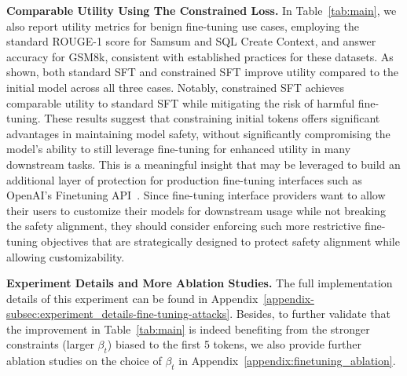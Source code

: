 \textbf{Comparable Utility Using The Constrained Loss.} In Table~\ref{tab:main}, we also report utility metrics for benign fine-tuning use cases, employing the standard ROUGE-1 score for Samsum and SQL Create Context, and answer accuracy for GSM8k, consistent with established practices for these datasets. As shown, both standard SFT and constrained SFT improve utility compared to the initial model across all three cases. Notably, constrained SFT achieves comparable utility to standard SFT while mitigating the risk of harmful fine-tuning. These results suggest that constraining initial tokens offers significant advantages in maintaining model safety, without significantly compromising the model's ability to still leverage fine-tuning for enhanced utility in many downstream tasks. This is a meaningful insight that may be leveraged to build an additional layer of protection for production fine-tuning interfaces such as OpenAI's Finetuning API~\cite{openaiFinetune}. Since fine-tuning interface providers want to allow their users to customize their models for downstream usage while not breaking the safety alignment, they should consider enforcing such more restrictive fine-tuning objectives that are strategically designed to protect safety alignment while allowing customizability. 






\textbf{Experiment Details and More Ablation Studies.} The full implementation details of this experiment can be found in Appendix~\ref{appendix-subsec:experiment_details-fine-tuning-attacks}. Besides, to further validate that the improvement in Table~\ref{tab:main} is indeed benefiting from the stronger constraints (larger $\beta_t$) biased to the first 5 tokens, we also provide further ablation studies on the choice of $\beta_t$ in Appendix~\ref{appendix:finetuning_ablation}.







